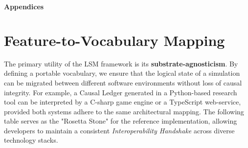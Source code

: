 \documentclass[12pt, a4paper]{article}
\begin{document}
\clearpage
\appendix

\thispagestyle{empty}
\vspace*{0.35\textheight}
\begin{center}
{\LARGE\bfseries Appendices}
\end{center}
\vfill
\clearpage





\newpage
\section{Feature-to-Vocabulary Mapping}
\label{app:mapping}

The primary utility of the LSM framework is its \textbf{substrate-agnosticism}. By defining a portable vocabulary, we ensure that the logical state of a simulation can be migrated between different software environments without loss of causal integrity. For example, a Causal Ledger generated in a Python-based research tool can be interpreted by a C-sharp game engine or a TypeScript web-service, provided both systems adhere to the same architectural mapping. The following table serves as the "Rosetta Stone" for the reference implementation, allowing developers to maintain a consistent \textit{Interoperability Handshake} across diverse technology stacks.
\end{document}
